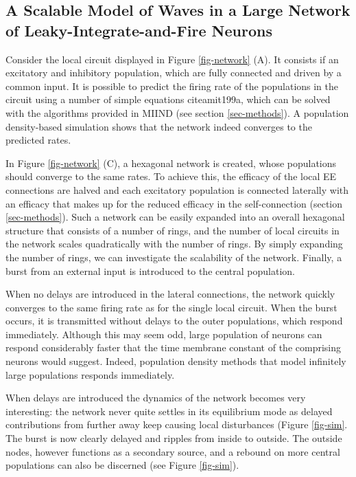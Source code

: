 \documentclass[12pt]{article}
\begin{document}
\subsection{A Scalable Model of Waves in a Large Network of Leaky-Integrate-and-Fire Neurons}
Consider the local circuit displayed in Figure \ref{fig-network} (A). It consists if an excitatory and inhibitory population, which are fully connected
and driven by a common input. It is possible to predict the firing rate of the populations in the circuit using a number of simple equations
cite{amit199a}, which can be solved with the algorithms provided in MIIND (see section \ref{sec-methods}). A population density-based simulation
shows that the network indeed converges to the predicted rates.

In Figure \ref{fig-network} (C), a hexagonal network is created, whose populations should converge to the same rates. To achieve this, the efficacy
of the local EE connections are halved and each excitatory population is connected laterally with an efficacy that makes up for the reduced
efficacy in the self-connection (section \ref{sec-methods}). Such a network can be easily expanded into an overall hexagonal structure that consists
of a number of rings, and the number of local circuits in the network scales quadratically with the number of rings. By simply expanding the number
of rings, we can investigate the scalability of the network. Finally, a burst from an external input is introduced to the central population.

When no delays are introduced in the lateral connections, the network quickly converges to the same firing rate as for the single local circuit. When
the burst occurs, it is transmitted without delays to the outer populations, which respond immediately. Although this may seem odd, large population
of neurons can respond considerably faster that the time membrane constant of the comprising neurons would suggest. Indeed, population density methods
that model infinitely large populations responds immediately.
 
When delays are introduced the dynamics of the network becomes very interesting: the network never quite settles in its equilibrium mode as
delayed contributions from further away keep  causing local disturbances (Figure \ref{fig-sim}. The burst is now clearly delayed and
ripples from inside to outside. The outside nodes, however functions as a secondary source, and a rebound on more central populations can
also be discerned (see Figure \ref{fig-sim}).
\end{document}
